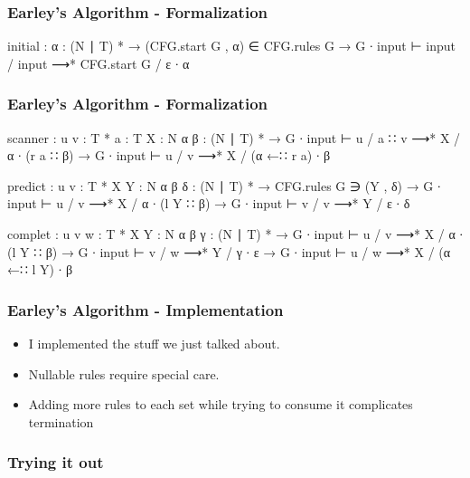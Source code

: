 \begin{frame}
	\frametitle{Earley's Algorithm - Formalization}
	\begin{code}
	  initial : {α : (N ∣ T) *} →
	    (CFG.start G , α) ∈ CFG.rules G →
	    G ∙ input ⊢ input / input ⟶* CFG.start G / ε ∙ α
	\end{code}
\end{frame}

\begin{frame}
	\frametitle{Earley's Algorithm - Formalization}
	\begin{code}
	  scanner : {u v : T *} {a : T} {X : N} {α β : (N ∣ T) *} →
	    G ∙ input ⊢ u / a ∷ v ⟶* X / α ∙ (r a ∷ β) →
	    G ∙ input ⊢ u / v ⟶* X / (α ←∷ r a) ∙ β

	  predict : {u v : T *} {X Y : N} {α β δ : (N ∣ T) *} →
	    CFG.rules G ∋ (Y , δ) →
	    G ∙ input ⊢ u / v ⟶* X / α ∙ (l Y ∷ β) →
	    G ∙ input ⊢ v / v ⟶* Y / ε ∙ δ

	  complet : {u v w : T *} {X Y : N} {α β γ : (N ∣ T) *} →
	    G ∙ input ⊢ u / v ⟶* X / α ∙ (l Y ∷ β) →
	    G ∙ input ⊢ v / w ⟶* Y / γ ∙ ε →
	    G ∙ input ⊢ u / w ⟶* X / (α ←∷ l Y) ∙ β
	\end{code}
\end{frame}

\begin{frame}
	\frametitle{Earley's Algorithm - Implementation}
	\begin{itemize}
		\item I implemented the stuff we just talked about.
		\item Nullable rules require special care.
		\item Adding more rules to each set while trying to consume it 
			complicates termination
	\end{itemize}
\end{frame}

\begin{frame}
	\frametitle{Trying it out}
\end{frame}


